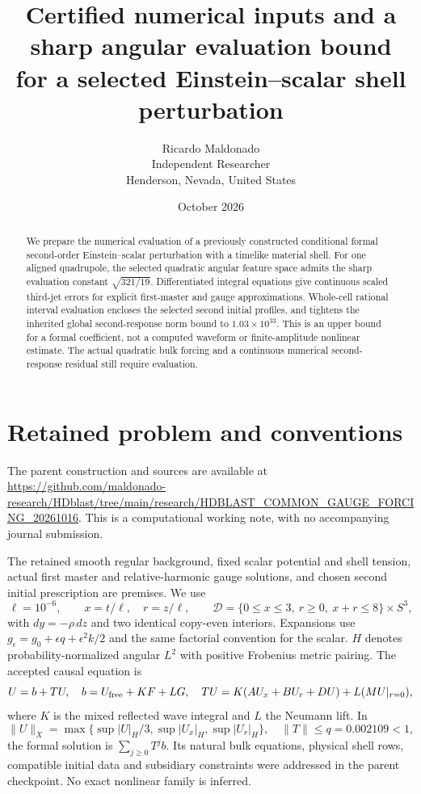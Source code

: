 \documentclass[11pt]{article}
\title{Certified numerical inputs and a sharp angular evaluation bound\\for a selected Einstein--scalar shell perturbation}
\author{Ricardo Maldonado\\Independent Researcher\\Henderson, Nevada, United States}
\date{October 2026}
\begin{document}
\maketitle
\begin{abstract}
We prepare the numerical evaluation of a previously constructed conditional formal second-order Einstein--scalar perturbation with a timelike material shell. For one aligned quadrupole, the selected quadratic angular feature space admits the sharp evaluation constant $\sqrt{321/19}$. Differentiated integral equations give continuous scaled third-jet errors for explicit first-master and gauge approximations. Whole-cell rational interval evaluation encloses the selected second initial profiles, and tightens the inherited global second-response norm bound to $1.03\times10^{33}$. This is an upper bound for a formal coefficient, not a computed waveform or finite-amplitude nonlinear estimate. The actual quadratic bulk forcing and a continuous numerical second-response residual still require evaluation.
\end{abstract}

\section{Retained problem and conventions}
The parent construction and sources are available at \url{https://github.com/maldonado-research/HDblast/tree/main/research/HDBLAST_COMMON_GAUGE_FORCING_20261016}. This is a computational working note, with no accompanying journal submission.

The retained smooth regular background, fixed scalar potential and shell tension, actual first master and relative-harmonic gauge solutions, and chosen second initial prescription are premises. We use
\[
\ell=10^{-6},\qquad x=t/\ell,\quad r=z/\ell,\qquad
\mathcal D=\{0\le x\le3,\ r\ge0,\ x+r\le8\}\times S^3,
\]
with $dy=-\rho\,dz$ and two identical copy-even interiors. Expansions use $g_\epsilon=g_0+\epsilon q+\epsilon^2 k/2$ and the same factorial convention for the scalar. $H$ denotes probability-normalized angular $L^2$ with positive Frobenius metric pairing. The accepted causal equation is
\[
U=b+TU,\quad b=U_{\rm free}+KF+LG,\quad
TU=K(AU_x+BU_r+DU)+L(MU|_{r=0}),
\]
where $K$ is the mixed reflected wave integral and $L$ the Neumann lift. In
\[
\|U\|_X=\max\{\sup|U|_H/3,\sup|U_x|_H,\sup|U_r|_H\},
\quad\|T\|\le q=0.002109<1,
\]
the formal solution is $\sum_{j\ge0}T^jb$. Its natural bulk equations, physical shell rows, compatible initial data and subsidiary constraints were addressed in the parent checkpoint. No exact nonlinear family is inferred.
\end{document}
